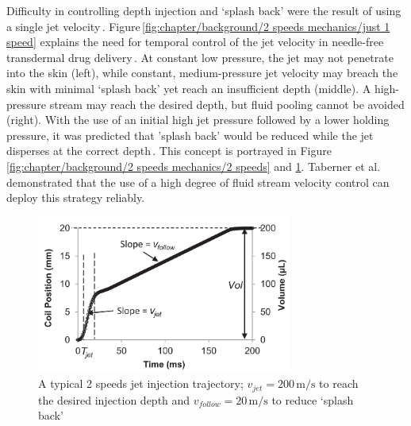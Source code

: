         
        Difficulty in controlling depth injection and ‘splash back’ were the result of using a single jet velocity\,\cite{schramm2002}. Figure\,\ref{fig:chapter/background/2 speeds mechanics/just 1 speed} explains the need for temporal control of the jet velocity in needle-free transdermal drug delivery\,\cite{Mitragotri2005}. At constant low pressure, the jet may not penetrate into the skin (left), while constant, medium-pressure jet velocity may breach the skin with minimal ‘splash back’ yet reach an insufficient depth (middle). A high-pressure stream may reach the desired depth, but fluid pooling cannot be avoided (right). With the use of an initial high jet pressure followed by a lower holding pressure, it was predicted that ’splash back’ would be reduced while the jet disperses at the correct depth\,\cite{wendell2006}. This concept is portrayed in Figure\,\ref{fig:chapter/background/2 speeds mechanics/2 speeds} and \ref{fig:chapter/background/2 speeds ideas}. Taberner et al.\,\cite{taberner2012} demonstrated that the use of a high degree of fluid stream velocity control can deploy this strategy reliably.
        
        
        \begin{figure}[h]
            \centering
            \includegraphics[width=0.75\textwidth]{chap2/images/2_jet_speeds_idea.png}
            \caption[A typical 2 speeds jet injection trajectory; $v_{jet}=200\,\mathrm{m/s}$ to reach the desired injection depth and $v_{follow}=20\,\mathrm{m/s}$ to reduce ‘splash back’]{A typical 2 speeds jet injection trajectory; $v_{jet}=200\,\mathrm{m/s}$ to reach the desired injection depth and $v_{follow}=20\,\mathrm{m/s}$ to reduce ‘splash back’ \,\cite{taberner2012}}
          \label{fig:chapter/background/2 speeds ideas}
        \end{figure}
    
    
